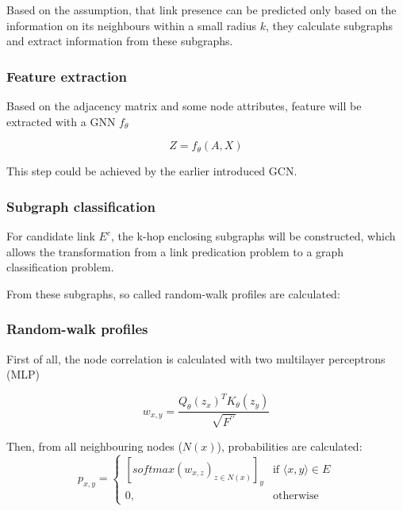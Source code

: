Based on the assumption, that link presence can be predicted 
only based on the information on its neighbours within a small radius $k$,
they calculate subgraphs and extract information from these subgraphs.

\subsubsection{Feature extraction}
Based on the adjacency matrix and some node attributes, 
feature will be extracted with a GNN $f_{\theta}$

\begin{equation}
    Z = f_{\theta} (A,X)
\end{equation}

This step could be achieved by the earlier introduced GCN.

\subsubsection{Subgraph classification}

For candidate link $E^c$, the k-hop enclosing subgraphs
 will be constructed, which allows the transformation
from a link predication problem to a graph classification problem.


From these subgraphs, so called random-walk profiles are calculated:

\subsubsection{Random-walk profiles}

First of all, the node correlation is calculated with two multilayer perceptrons (MLP)

\begin{equation}
    w_{x,y} = \frac{Q_{\theta}(z_x)^T K_{\theta}(z_y)}{\sqrt{F^{\prime\prime}}}
\end{equation}

Then, from all neighbouring nodes ($N(x)$), probabilities are calculated:
\begin{equation}
    p_{x,y} = 
    \begin{cases}
            [softmax(w_{x,z})_{z \in N(x)}]_y  & \text{if } \langle x , y \rangle \in E \\
            0, & \text{otherwise}
    \end{cases}
\end{equation}


